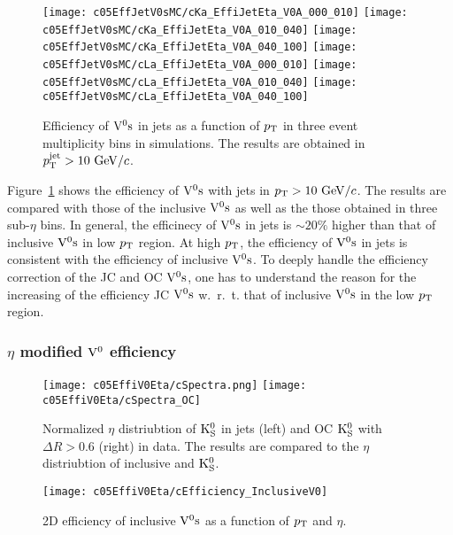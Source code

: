 \begin{figure}[htb]
\begin{center}
\texttt{[image: c05EffJetV0sMC/cKa\_EffiJetEta\_V0A\_000\_010]}
\texttt{[image: c05EffJetV0sMC/cKa\_EffiJetEta\_V0A\_010\_040]}
\texttt{[image: c05EffJetV0sMC/cKa\_EffiJetEta\_V0A\_040\_100]}
\texttt{[image: c05EffJetV0sMC/cLa\_EffiJetEta\_V0A\_000\_010]}
\texttt{[image: c05EffJetV0sMC/cLa\_EffiJetEta\_V0A\_010\_040]}
\texttt{[image: c05EffJetV0sMC/cLa\_EffiJetEta\_V0A\_040\_100]}
\caption{Efficiency of ${\rm V}^{0}{\rm s}$ in jets as a function of $p_{\rm T}$
         in three event multiplicity bins in simulations.
         The results are obtained in $p_{\rm T}^{\rm jet}>10~{\rm GeV}/c$.}
\label{fig:c05EffiJetV0sMC}
\end{center}
\end{figure}

Figure~\ref{fig:c05EffiJetV0sMC} shows the efficiency of ${\rm V}^{0}{\rm s}$ with jets
in $p_{\rm T}>10~{\rm GeV}/c$.
The results are compared with those of the inclusive ${\rm V}^{0}{\rm s}$ as well as
the those obtained in three sub-$\eta$ bins.
In general, the efficinecy of ${\rm V}^{0}{\rm s}$ in jets is $\sim 20\%$ higher than
that of inclusive ${\rm V}^{0}{\rm s}$ in low $p_{\rm T}$ region.
At high $p_{\rm T}$, the efficiency of ${\rm V}^{0}{\rm s}$ in jets is consistent with
the efficiency of inclusive ${\rm V}^{0}{\rm s}$.
To deeply handle the efficiency correction of the JC and OC ${\rm V}^{0}{\rm s}$,
one has to understand the reason for the increasing of the efficiency
JC ${\rm V}^{0}{\rm s}$ w.~r.~t. that of inclusive ${\rm V}^{0}{\rm s}$ in the low $p_{\rm T}$ region.

\subsubsection{$\eta$ modified ${\rm V}^{0}$ efficiency}
\label{sec:c05ScaledV0Effi}

\begin{figure}[htb]
\begin{center}
\texttt{[image: c05EffiV0Eta/cSpectra.png]}
\texttt{[image: c05EffiV0Eta/cSpectra\_OC]}
\caption{Normalized $\eta$ distriubtion of ${\rm K}_{\rm S}^{0}$ in jets (left)
         and OC ${\rm K}_{\rm S}^{0}$ with $\Delta R>0.6$ (right) in data.
         The results are compared to the $\eta$ distriubtion of 
         inclusive and ${\rm K}_{\rm S}^{0}$.}
\label{fig:c05EffiJetV0Wgt}
\end{center}
\end{figure}

\begin{figure}[htb]
\begin{center}
\texttt{[image: c05EffiV0Eta/cEfficiency\_InclusiveV0]}
\caption{2D efficiency of inclusive ${\rm V}^{0}{\rm s}$ as a function of $p_{\rm T}$
         and $\eta$.}
\label{fig:c05EffiIncV02D}
\end{center}
\end{figure}

